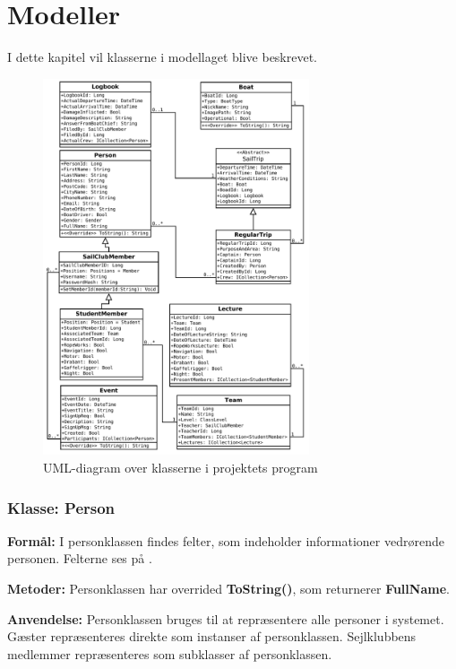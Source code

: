 \chapter{Modeller} \label{chap:klasser}

I dette kapitel vil klasserne i modellaget blive beskrevet.

\begin{figure}[H]
  \centering
  \includegraphics[width=0.70\textwidth]{images/flowcharts/UML.pdf}
  \caption{UML-diagram over klasserne i projektets program}
  \label{img:UML}
\end{figure}

\subsection{Klasse: Person}

\textbf{Formål:}
I personklassen findes felter, som indeholder informationer vedrørende personen. Felterne ses på .

\textbf{Metoder:}
Personklassen har overrided \textbf{ToString()}, som returnerer \textbf{FullName}.

\textbf{Anvendelse:}
Personklassen bruges til at repræsentere alle personer i systemet. 
Gæster repræsenteres direkte som instanser af personklassen. Sejlklubbens medlemmer repræsenteres som subklasser af personklassen. 

